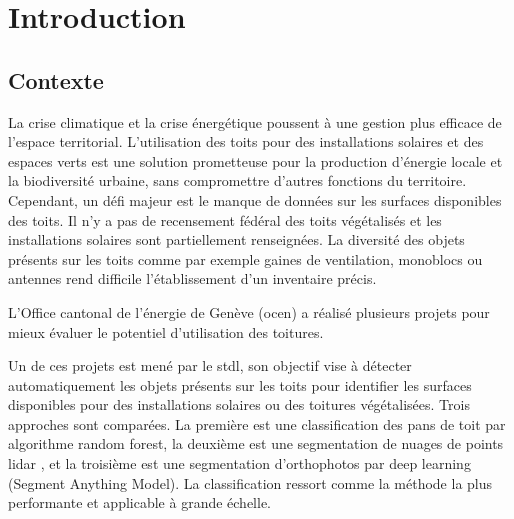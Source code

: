 \chapter{Introduction}
\label{chap:introduction}

\section{Contexte}

\par{La crise climatique \cite{lee_ipcc_2023} et la crise énergétique poussent à une gestion plus efficace de l'espace territorial. L'utilisation des toits pour des installations solaires et des espaces verts est une solution prometteuse pour la production d'énergie locale et la biodiversité urbaine, sans compromettre d'autres fonctions du territoire. Cependant, un défi majeur est le manque de données sur les surfaces disponibles des toits. Il n'y a pas de recensement fédéral des toits végétalisés et les installations solaires sont partiellement renseignées. La diversité des objets présents sur les toits comme par exemple gaines de ventilation, monoblocs ou antennes rend difficile l'établissement d'un inventaire précis.}

\par{L'Office cantonal de l'énergie de Genève (\acrshort{ocen}) a réalisé plusieurs projets pour mieux évaluer le potentiel d’utilisation des toitures.}

\par{Un de ces projets \cite{herny_detection_2024} est mené par le \gls{stdl}, son objectif vise à détecter automatiquement les objets présents sur les toits pour identifier les surfaces disponibles pour des installations solaires ou des toitures végétalisées. Trois approches sont comparées. La première est une classification des pans de toit par algorithme random forest, la deuxième est une segmentation de nuages de points \gls{lidar} , et la troisième est une segmentation d'orthophotos par deep learning (Segment Anything Model). La classification ressort comme la méthode la plus performante et applicable à grande échelle.}


